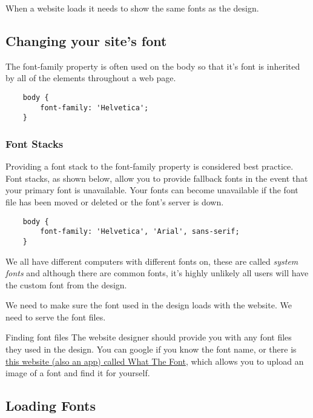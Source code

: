 When a website loads it needs to show the same fonts as the design.

\subsection{Changing your site's font}

The font-family property is often used on the body so that it's font is inherited by all of the elements throughout a web page.

\begin{verbatim}
    body {
        font-family: 'Helvetica';
    }
\end{verbatim}

\subsubsection{Font Stacks}

Providing a font stack to the font-family property is considered best practice. Font stacks, as shown below, allow you to provide fallback fonts in the event that your primary font is unavailable. Your fonts can become unavailable if the font file has been moved or deleted or the font's server is down.

\begin{verbatim}
    body {
        font-family: 'Helvetica', 'Arial', sans-serif;
    }
\end{verbatim}

We all have different computers with different fonts on, these are called \textit{system fonts} and although there are common fonts, it's highly unlikely all users will have the custom font from the design.

We need to make sure the font used in the design loads with the website. We need to serve the font files.

\begin{infobox}{Finding font files}
    The website designer should provide you with any font files they used in the design. You can google if you know the font name, or there is \href{https://www.myfonts.com/WhatTheFont}{this website (also an app) called What The Font}, which allows you to upload an image of a font and find it for yourself.
\end{infobox}

\subsection{Loading Fonts}

